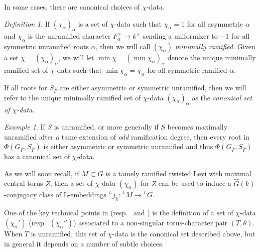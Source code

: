 \documentclass[reqno]{amsart}
\numberwithin{equation}{subsection}
\newcommand{\ol}[1]{\overline{#1}}
\newcommand{\co}{\colon}
\newcommand{\ld}{{}^L}
\theoremstyle{remark}
\newtheorem{defn}[thm]{Definition}
\newtheorem{example}[thm]{Example}
\numberwithin{equation}{subsection}
\numberwithin{figure}{subsection}
\begin{document}
In some cases, there are canonical choices of $\chi$-data.


\begin{defn}\label{defn:minimally-ramified-chi-data}If $(\chi_\alpha)_\alpha$ is a set of $\chi$-data such that $\chi_\alpha = 1$ for all asymmetric $\alpha$ and $\chi_\alpha$ is the unramified character $F_\alpha^\times \to k^\times$ sending a uniformizer to $-1$ for all symmetric unramified roots $\alpha$, then we will call $(\chi_\alpha)$ \emph{minimally ramified}. Given a set $\chi = (\chi_\alpha)_\alpha$, we will let $\min \chi = (\min \chi_\alpha)_\alpha$ denote the unique minimally ramified set of $\chi$-data such that $\min \chi_\alpha = \chi_\alpha$ for all symmetric ramified $\alpha$. 

If all roots for $S_{\ol F}$ are either asymmetric or symmetric unramified, then we will refer to the unique minimally ramified set of $\chi$-data $(\chi_\alpha)_\alpha$ as the \textit{canonical set of $\chi$-data}.
\end{defn}

\begin{example}\label{ex:unramified-chi-data}
If $S$ is unramified, or more generally if $S$ becomes maximally unramified after a tame extension of \textit{odd} ramification degree, then every root in $\Phi(G_{\ol F}, S_{\ol F})$ is either asymmetric or symmetric unramified and thus $\Phi(G_{\ol F}, S_{\ol F})$ has a canonical set of $\chi$-data. 
\end{example}

As we will soon recall, if $M \subset G$ is a tamely ramified twisted Levi with maximal central torus $Z$, then a set of $\chi$-data $(\chi_\alpha)$ for $Z$ can be used to induce a $\widehat{G}(k)$-conjugacy class of L-embeddings $\ld j_\chi\co \ld M \to \ld G$.

One of the key technical points in \cite{Kal19} (resp.\ \cite{Kal21b} and \cite{FKS23}) is the definition of a set of $\chi$-data $(\chi_\alpha')$ (resp.\ $(\chi_\alpha'')$) associated to a non-singular torus-character pair $(T, \theta)$. When $T$ is unramified, this set of $\chi$-data is the canonical set described above, but in general it depends on a number of subtle choices.
\end{document}

